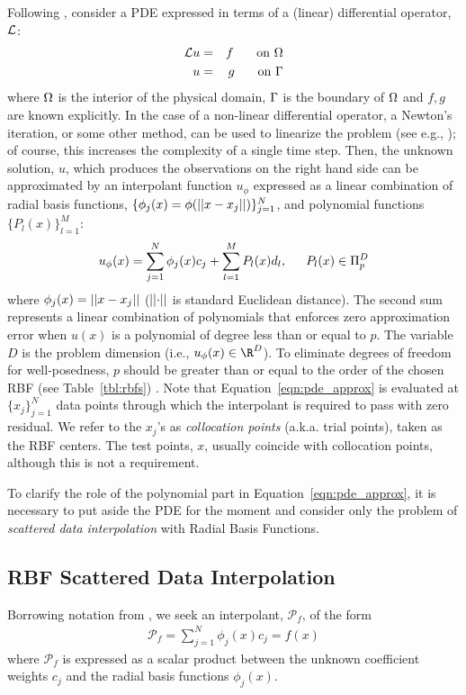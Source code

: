 \documentclass{report}
\begin{document}
{Following \cite{Mouat2002}, consider a PDE expressed in terms of a (linear) differential operator, $\diffop$: 
\begin{eqnarray*}
\mathcal{L}u & = & f \hskip1.5em \textrm{ on } \Omega \\
u &=& g \hskip1.5em \textrm{ on } \Gamma
\end{eqnarray*}
where $\Omega$ is the interior of the physical domain, $\Gamma$ is the boundary of $\Omega$ and $f,g$ are known explicitly. In the case of a non-linear differential operator, a Newton's iteration, or some other method, can be used to linearize the problem (see e.g., \cite{WrightFornberg06}); of course, this increases the complexity of a single time step. Then, the unknown solution, $u$, which produces the observations on the right hand side can be approximated by an interpolant function $u_{\phi}$ expressed as a linear combination of radial basis functions, $\{\phi_j(x) = \phi(\left|\left|x-x_j\right|\right|)\}_{j=1}^{N}$, and polynomial functions$\{P_l(x)\}_{l=1}^{M}$:
\begin{equation}
	u_{\phi}(x) = \sum_{j=1}^{N}  \phi_j(x) c_{j} + \sum_{l=1}^{M}  P_l(x) d_{l}, \hskip1.5em P_l(x) \in \Pi^{D}_{p}
	\label{eqn:pde_approx}
\end{equation}
where $\phi_j(x) = \left|\left|x - x_j\right|\right|$ ($\left|\left|\cdot\right|\right|$ is standard Euclidean distance). The 
second sum represents a linear combination of polynomials that enforces zero approximation error
 when $u(x)$ is a polynomial of degree less than or equal to $p$. The variable $D$ is the 
 problem dimension (i.e., $u_{\phi}(x) \in \R^{D}$). 
To eliminate degrees of freedom for well-posedness, $p$ should be greater than or equal to the order of the chosen RBF
 (see Table~\ref{tbl:rbfs}) \cite{Iske2004}.  
Note that Equation~\ref{eqn:pde_approx} is evaluated 
 at $\{x_j\}_{j=1}^{N}$ 
data points through which the interpolant is required to pass with zero residual.  We refer to 
the $x_j$'s as \emph{collocation points} (a.k.a. trial points), taken as the RBF centers. The test points, $x$, usually coincide with collocation points, although this is not a requirement. 

To clarify the role of the polynomial part in Equation~\ref{eqn:pde_approx}, it is necessary to
put aside the PDE for the moment and consider only the problem of \emph{scattered data 
interpolation} with Radial Basis Functions.

\subsection{RBF Scattered Data Interpolation}
 Borrowing notation from \cite{Fasshauer2007, Iske2004}, 
we seek an interpolant, $\mathcal{P}_f$, of the form
\begin{eqnarray*}
\mathcal{P}_f = \sum_{j=1}^{N} \phi_j(x) c_{j} = f(x) \label{eq:rbf_scattered_data_interp}
\end{eqnarray*}
where $\mathcal{P}_f$ is expressed as a scalar product between the unknown coefficient weights $c_j$ and the radial basis functions $\phi_j(x)$.

}
\end{document}
